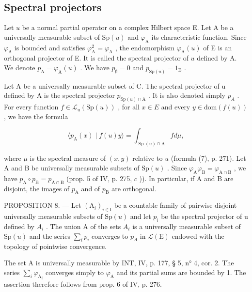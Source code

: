 \subsection{Spectral projectors}

Let \(u\) be a normal partial operator on a complex Hilbert space E. Let A be a universally measurable subset of \(\mathrm{Sp}(u)\) and \(\varphi_{\mathrm{A}}\) its characteristic function. Since \(\varphi_{\mathrm{A}}\) is bounded and satisfies \(\varphi_{\mathrm{A}}^{2} = \varphi_{\mathrm{A}}\) , the endomorphism \(\varphi_{\mathrm{A}}(u)\) of E is an orthogonal projector of E. It is called the spectral projector of \(u\) defined by A. We denote \(p_{\mathrm{A}} = \varphi_{\mathrm{A}}(u)\) . We have \(p_{\emptyset} = 0\) and \(p_{\mathrm{Sp}(u)} = 1_{\mathrm{E}}\) .

Let A be a universally measurable subset of C. The spectral projector of u defined by A is the spectral projector \(p_{\mathrm{Sp}(u)\cap\mathrm{A}}\) . It is also denoted simply \(p_{A}\) . For every function \(f \in \mathcal{L}_{\mathrm{u}}(\mathrm{Sp}(u))\) , for all \(x \in E\) and every \(y \in \mathrm{dom}(f(u))\) , we have the formula

\[
\langle p _ {\mathrm{A}} (x) \mid f (u) y \rangle = \int_ {\operatorname{Sp} (u) \cap \mathrm{A}} f d \mu ,\tag{10}
\]

where \(\mu\) is the spectral measure of \((x,y)\) relative to \(u\) (formula (7), p. 271). Let A and B be universally measurable subsets of \(\mathrm{Sp}(u)\) . Since \(\varphi_{\mathrm{A}}\varphi_{\mathrm{B}} = \varphi_{\mathrm{A}\cap \mathrm{B}}\) , we have \(p_{\mathrm{A}} \circ p_{\mathrm{B}} = p_{\mathrm{A}\cap \mathrm{B}}\) (prop. 5 of IV, p. 275, \(c\) )). In particular, if A and B are disjoint, the images of \(p_{\mathrm{A}}\) and of \(p_{\mathrm{B}}\) are orthogonal.

PROPOSITION 8. --- Let \((\mathrm{A}_{i})_{i\in\mathrm{I}}\) be a countable family of pairwise disjoint universally measurable subsets of \(\mathrm{Sp}(u)\) and let \(p_{i}\) be the spectral projector of u defined by \(A_{i}\) . The union A of the sets \(A_{i}\) is a universally measurable subset of \(\mathrm{Sp}(u)\) and the series \(\sum_{i}p_{i}\) converges to \(p_{A}\) in \(\mathcal{L}(\mathrm{E})\) endowed with the topology of pointwise convergence.

The set A is universally measurable by INT, IV, p. 177, § 5, n° 4, cor. 2. The series \(\sum_{i} \varphi_{\mathrm{A}_{i}}\) converges simply to \(\varphi_{\mathrm{A}}\) and its partial sums are bounded by 1. The assertion therefore follows from prop. 6 of IV, p. 276.

